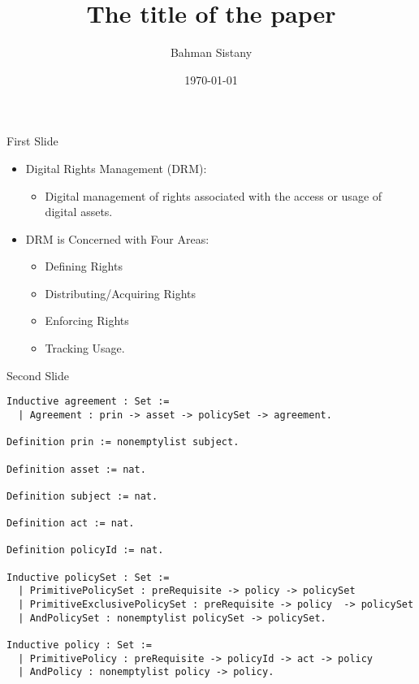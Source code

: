 \documentclass{beamer}
\title{The title of the paper}
\author{Bahman Sistany}
\date{\today}
\begin{document}
\begin{frame}
\titlepage
\end{frame}

\begin{frame}{First Slide}
\begin{itemize}
   \item Digital Rights Management (DRM):
   \begin{itemize}
      \item Digital management of rights associated with the access or usage of digital assets.
   \end{itemize}

   \item DRM is Concerned with Four Areas:
     \begin{itemize}
	\item Defining Rights
	\item Distributing/Acquiring Rights
	\item Enforcing Rights
	\item Tracking Usage.
     \end{itemize}
\end{itemize}
\end{frame}
\begin{frame}[fragile]{Second Slide}
\lstset{language=Coq}
\begin{lstlisting}
Inductive agreement : Set :=
  | Agreement : prin -> asset -> policySet -> agreement.

Definition prin := nonemptylist subject.

Definition asset := nat.

Definition subject := nat.

Definition act := nat.

Definition policyId := nat.

Inductive policySet : Set :=
  | PrimitivePolicySet : preRequisite -> policy -> policySet 
  | PrimitiveExclusivePolicySet : preRequisite -> policy  -> policySet 
  | AndPolicySet : nonemptylist policySet -> policySet.

Inductive policy : Set :=
  | PrimitivePolicy : preRequisite -> policyId -> act -> policy 
  | AndPolicy : nonemptylist policy -> policy.

\end{lstlisting}
\end{frame}
\end{document}
